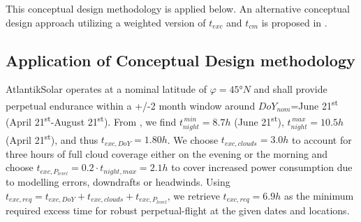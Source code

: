 This conceptual design methodology is applied below. An alternative conceptual design approach utilizing a weighted version of $t_{exc}$ and $t_{cm}$ is proposed in \cite{Morton_ICRA2013}. 

 
\subsection{Application of Conceptual Design methodology} \label{sec:ConceptDesignApplication}

AtlantikSolar operates at a nominal latitude of $\varphi=45°N$ and shall provide perpetual endurance within a +/-2 month window around $DoY_{nom}$=June 21\textsuperscript{st} (April 21\textsuperscript{st}-August 21\textsuperscript{st}). From \cite{Duffie_SolarEngineering}, we find $t_{night}^{\,min}=8.7h$ (June 21\textsuperscript{st}), $t_{night}^{\,max}=10.5h$(April 21\textsuperscript{st}), and thus $t_{exc,DoY}=1.80h$. We choose $t_{exc,clouds}=3.0h$ to account for three hours of full cloud coverage either on the evening or the morning and choose $t_{exc,P_{level}}=0.2\cdot t_{night,max}=2.1h$ to cover increased power consumption due to modelling errors, downdrafts or headwinds. Using $t_{exc,req}=t_{exc,DoY}+t_{exc,clouds}+t_{exc,P_{level}}$, we retrieve $t_{exc,req}=6.9h$ as the minimum required excess time for robust perpetual-flight at the given dates and locations. 

